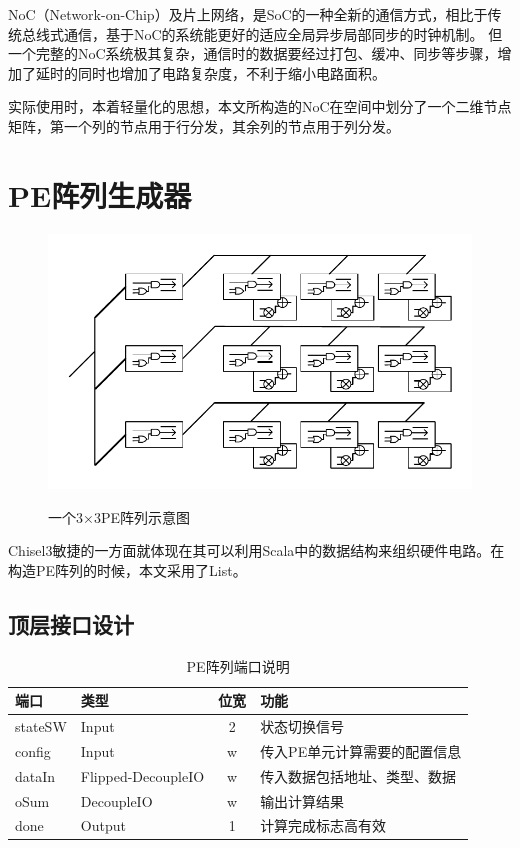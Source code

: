 NoC（Network-on-Chip）及片上网络，是SoC的一种全新的通信方式，相比于传统总线式通信，基于NoC的系统能更好的适应全局异步局部同步的时钟机制。
但一个完整的NoC系统极其复杂，通信时的数据要经过打包、缓冲、同步等步骤，增加了延时的同时也增加了电路复杂度，不利于缩小电路面积。

实际使用时，本着轻量化的思想，本文所构造的NoC在空间中划分了一个二维节点矩阵，第一个列的节点用于行分发，其余列的节点用于列分发。

\section{PE阵列生成器}
\begin{figure}[h]
    \centering
    \includegraphics{../pdf/PEArray.pdf}\\
    \caption{一个3×3PE阵列示意图}
\end{figure}
Chisel3敏捷的一方面就体现在其可以利用Scala中的数据结构来组织硬件电路。在构造PE阵列的时候，本文采用了List。
    \subsection{顶层接口设计}
\begin{table}[h] %
    \centering
    \caption{PE阵列端口说明} %
    \begin{tabular}{l|l|c|l} %
    \hline  
    \hline  
    端口 & 类型 & 位宽 & 功能 \\ %
    \hline %
    stateSW & Input & 2 & 状态切换信号 \\
    \hline  
    config & Input & w & 传入PE单元计算需要的配置信息 \\
    \hline  
    dataIn & Flipped-DecoupleIO & w & 传入数据包括地址、类型、数据 \\
    \hline  
    oSum & DecoupleIO & w & 输出计算结果 \\
    \hline  
    done & Output & 1 & 计算完成标志高有效 \\
    \hline  
    \hline  
    \end{tabular}  
\end{table}  
